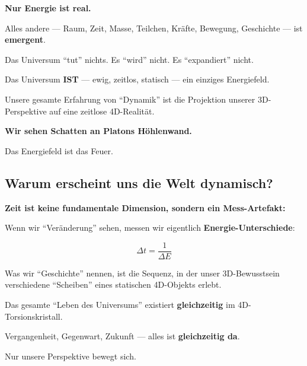 	\begin{philosophical}
		\textbf{Nur Energie ist real.}
		
		\vspace{0.3cm}
		
		Alles andere — Raum, Zeit, Masse, Teilchen, Kräfte, Bewegung, Geschichte — ist \textbf{emergent}.
		
		\vspace{0.3cm}
		
		Das Universum \enquote{tut} nichts. Es \enquote{wird} nicht. Es \enquote{expandiert} nicht.
		
		\vspace{0.3cm}
		
		Das Universum \textbf{IST} — ewig, zeitlos, statisch — ein einziges Energiefeld.
		
		\vspace{0.3cm}
		
		Unsere gesamte Erfahrung von \enquote{Dynamik} ist die Projektion unserer 3D-Perspektive auf eine zeitlose 4D-Realität.
		
		\vspace{0.3cm}
		
		\textbf{Wir sehen Schatten an Platons Höhlenwand.}
		
		\vspace{0.3cm}
		
		Das Energiefeld ist das Feuer.
	\end{philosophical}
	
	\subsection{Warum erscheint uns die Welt dynamisch?}
	
	\begin{important}
		\textbf{Zeit ist keine fundamentale Dimension, sondern ein Mess-Artefakt:}
		
		\vspace{0.3cm}
		
		Wenn wir \enquote{Veränderung} sehen, messen wir eigentlich \textbf{Energie-Unterschiede}:
		
		\begin{equation}
			\Delta t = \frac{1}{\Delta E}
		\end{equation}
		
		\vspace{0.3cm}
		
		Was wir \enquote{Geschichte} nennen, ist die Sequenz, in der unser 3D-Bewusstsein verschiedene \enquote{Scheiben} eines statischen 4D-Objekts erlebt.
		
		\vspace{0.3cm}
		
		Das gesamte \enquote{Leben des Universums} existiert \textbf{gleichzeitig} im 4D-Torsionskristall.
		
		\vspace{0.3cm}
		
		Vergangenheit, Gegenwart, Zukunft — alles ist \textbf{gleichzeitig da}.
		
		Nur unsere Perspektive bewegt sich.
	\end{important}
	
